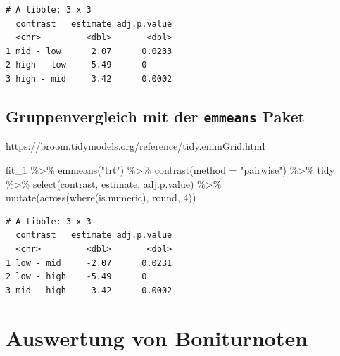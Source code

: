 \documentclass[
  letterpaper,
  DIV=11,
  oneside]{scrreport}
\newenvironment{Shaded}{\begin{snugshade}}{\end{snugshade}}
\newcommand{\AttributeTok}[1]{\textcolor[rgb]{0.40,0.45,0.13}{#1}}
\newcommand{\DecValTok}[1]{\textcolor[rgb]{0.68,0.00,0.00}{#1}}
\newcommand{\FunctionTok}[1]{\textcolor[rgb]{0.28,0.35,0.67}{#1}}
\newcommand{\NormalTok}[1]{\textcolor[rgb]{0.00,0.23,0.31}{#1}}
\newcommand{\SpecialCharTok}[1]{\textcolor[rgb]{0.37,0.37,0.37}{#1}}
\newcommand{\StringTok}[1]{\textcolor[rgb]{0.13,0.47,0.30}{#1}}
\begin{document}
\begin{verbatim}
# A tibble: 3 x 3
  contrast   estimate adj.p.value
  <chr>         <dbl>       <dbl>
1 mid - low      2.07      0.0233
2 high - low     5.49      0     
3 high - mid     3.42      0.0002
\end{verbatim}

\hypertarget{gruppenvergleich-mit-der-emmeans-paket}{%
\subsection{\texorpdfstring{Gruppenvergleich mit der \texttt{emmeans}
Paket}{Gruppenvergleich mit der emmeans Paket}}\label{gruppenvergleich-mit-der-emmeans-paket}}

https://broom.tidymodels.org/reference/tidy.emmGrid.html

\begin{Shaded}
\begin{Highlighting}[]
\NormalTok{fit\_1 }\SpecialCharTok{\%\textgreater{}\%} 
  \FunctionTok{emmeans}\NormalTok{(}\StringTok{"trt"}\NormalTok{) }\SpecialCharTok{\%\textgreater{}\%} 
  \FunctionTok{contrast}\NormalTok{(}\AttributeTok{method =} \StringTok{"pairwise"}\NormalTok{) }\SpecialCharTok{\%\textgreater{}\%} 
\NormalTok{  tidy }\SpecialCharTok{\%\textgreater{}\%} 
  \FunctionTok{select}\NormalTok{(contrast, estimate, adj.p.value) }\SpecialCharTok{\%\textgreater{}\%} 
  \FunctionTok{mutate}\NormalTok{(}\FunctionTok{across}\NormalTok{(}\FunctionTok{where}\NormalTok{(is.numeric), round, }\DecValTok{4}\NormalTok{))}
\end{Highlighting}
\end{Shaded}

\begin{verbatim}
# A tibble: 3 x 3
  contrast   estimate adj.p.value
  <chr>         <dbl>       <dbl>
1 low - mid     -2.07      0.0231
2 low - high    -5.49      0     
3 mid - high    -3.42      0.0002
\end{verbatim}

\hypertarget{auswertung-von-boniturnoten}{%
\section{Auswertung von
Boniturnoten}\label{auswertung-von-boniturnoten}}
\end{document}
